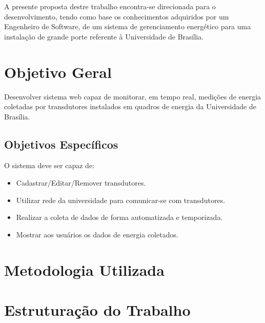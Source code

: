 A presente proposta destre trabalho encontra-se direcionada para o desenvolvimento, tendo como base os conhecimentos
adquiridos por um Engenheiro de Software, de um sistema de gerenciamento energético para uma instalação de grande porte referente à Universidade de Brasília.

\section{Objetivo Geral}
Desenvolver sistema web capaz de monitorar, em tempo real, medições de energia coletadas por transdutores
instalados em quadros de energia da Universidade de Brasília.

\subsection{Objetivos Específicos}
O sistema deve ser capaz de:
\begin{itemize}
    \item Cadastrar/Editar/Remover transdutores.
    \item Utilizar rede da universidade para comunicar-se com transdutores.
    \item Realizar a coleta de dados de forma automatizada e temporizada.
    \item Mostrar aos usuários os dados de energia coletados.
\end{itemize}

\section{Metodologia Utilizada}

\section{Estruturação do Trabalho}
